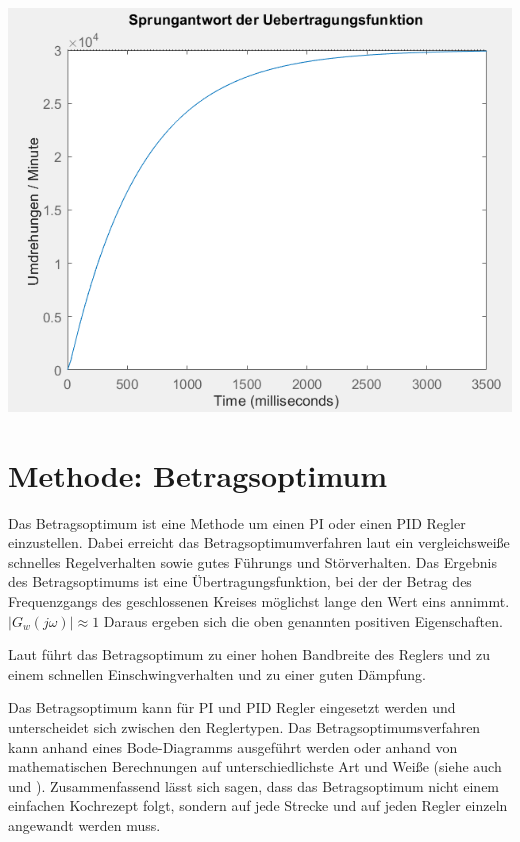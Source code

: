 \documentclass[            %
draft = false,             		%
paper = A4,                		%
pagesize = pdftex,         		%
fontsize = 10pt,           		%
DIV=15,                    		%
twoside = false,           		%
twocolumn = false,         		%
parskip = full,           		%
chapterprefix = false,      		%
appendixprefix = true,     		%
headinclude = false,       		%
footinclude = false,       		%
mpinclude = false,         		%
numbers = auto,            		%
cleardoublepage = plain,   		%
footnotes = multiple,      		%
titlepage = true,          		%
headings = normal,         		%
open = right,              		%
bibliography = openstyle,  		%
listof = chaptergapline,   		%
overfullrule = true,
]{scrbook}
\begin{document}
\begin{center}
   \begin{minipage}[b]{0.9\textwidth}
      \includegraphics[scale=0.7]{Bilder/Sprungantwort_Gegenkopplung.PNG}
      \label{fig:Sprungantwort_Gegenkopplung} 
   \end{minipage}
\end{center}





\newpage
{\let\clearpage\relax \chapter{Methode: Betragsoptimum}} \label{chpt:Betragsoptimum}

Das Betragsoptimum ist eine Methode um einen PI oder einen PID Regler einzustellen.
Dabei erreicht das Betragsoptimumverfahren laut \cite{philippsen2004einstieg} ein vergleichsweiße schnelles Regelverhalten sowie gutes Führungs und Störverhalten.
Das Ergebnis des Betragsoptimums ist eine Übertragungsfunktion, bei der der Betrag des Frequenzgangs des geschlossenen Kreises möglichst lange den Wert eins annimmt.
$\bigl|G_{w}(j\omega)\bigl| \approx 1$
Daraus ergeben sich die oben genannten positiven Eigenschaften.

Laut \cite{Skript_Regelungstechnik} führt das Betragsoptimum zu einer hohen Bandbreite des Reglers und zu einem schnellen Einschwingverhalten und zu einer guten
Dämpfung.

Das Betragsoptimum kann für PI und PID Regler eingesetzt werden und unterscheidet sich zwischen den Reglertypen. Das Betragsoptimumsverfahren kann anhand eines Bode-Diagramms
ausgeführt werden oder anhand von mathematischen Berechnungen auf unterschiedlichste Art und Weiße (siehe auch \cite{antriebsregelungstechnik} 
und \cite{schulz2004regelungstechnik}). Zusammenfassend lässt sich sagen, dass das Betragsoptimum nicht einem einfachen Kochrezept folgt, 
sondern auf jede Strecke und auf jeden Regler einzeln angewandt werden muss.
\end{document}

